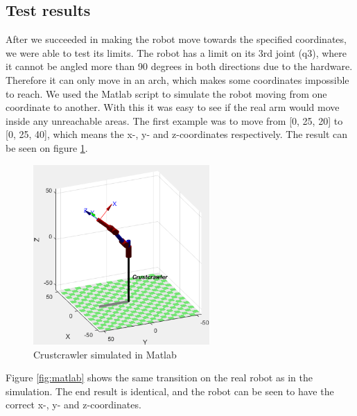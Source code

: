 \subsection{Test results}

After we succeeded in making the robot move towards the specified coordinates, we were able to test its limits. The robot has a limit on its 3rd joint (q3), where it cannot be angled more than 90 degrees in both directions due to the hardware. Therefore it can only move in an arch, which makes some coordinates impossible to reach. We used the Matlab script to simulate the robot moving from one coordinate to another. With this it was easy to see if the real arm would move inside any unreachable areas. The first example was to move from [0, 25, 20] to [0, 25, 40], which means the x-, y- and z-coordinates respectively. The result can be seen on figure \ref{fig:simulated_arm}.

\begin{figure}[H]
    \centering
    \includegraphics[width=0.6\textwidth]{figures/SimulatedArm.PNG}
    \caption{Crustcrawler simulated in Matlab}
    \label{fig:simulated_arm}
\end{figure}

Figure \ref{fig:matlab} shows the same transition on the real robot as in the simulation. The end result is identical, and the robot can be seen to have the correct x-, y- and z-coordinates.

